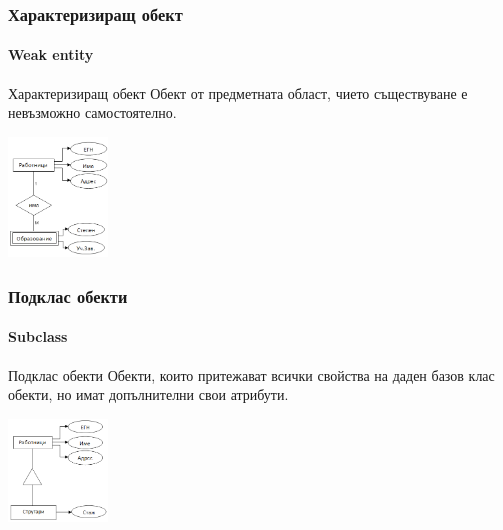 \documentclass{beamer}
\begin{document}
  \begin{frame}
    \frametitle{Характеризиращ обект}
    \framesubtitle{Weak entity}
    \begin{block}{Характеризиращ обект}
       Обект от предметната област, чието съществуване е невъзможно самостоятелно.
    \end{block}
    \includegraphics[width=100px]{img/weak_entity}
  \end{frame}

  \begin{frame}
    \frametitle{Подклас обекти}
    \framesubtitle{Subclass}
    \begin{block}{Подклас обекти}
      Обекти, които притежават всички свойства на даден базов клас обекти, но имат допълнителни свои атрибути.
    \end{block}
    \includegraphics[width=100px]{img/subclass}
  \end{frame}
  
  
\end{document}
